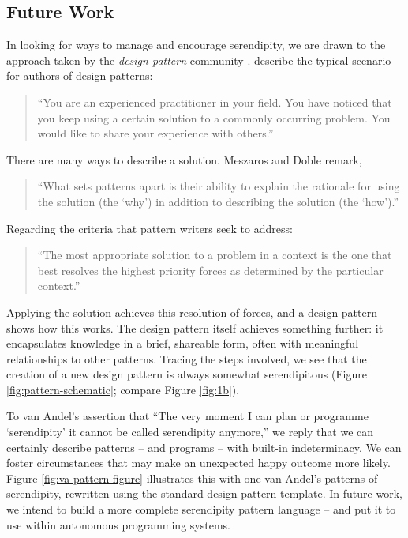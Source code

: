 \subsection{Future Work} \label{sec:futurework} \label{sec:hatching}

In looking for ways to manage and encourage serendipity, we are drawn
to the approach taken by the \emph{design pattern} community
\cite{alexander1999origins}. 
 describe the typical scenario for authors of design patterns:

\begin{quote}
\noindent ``You are an experienced practitioner in your field.  You
have noticed that you keep using a certain solution to a commonly
occurring problem.  You would like to share your experience with
others.''
\end{quote}
There are many ways to describe a solution.
Meszaros and Doble remark,
\begin{quote}
\noindent ``What sets patterns apart is their ability to explain the
rationale for using the solution (the `why') in addition to describing
the solution (the `how').''
\end{quote}
Regarding the criteria that pattern writers seek to address: 
\begin{quote}
\noindent ``The most appropriate solution to a problem in a context is
the one that best resolves the highest priority forces as determined
by the particular context.''
\end{quote}



%
%
Applying the solution achieves this resolution of forces, and a design
pattern shows how this works.  The design pattern itself achieves
something further: it encapsulates knowledge in a brief, shareable
form, often with meaningful relationships to other patterns.  Tracing
the steps involved, we see that the creation of a new design pattern
is always somewhat serendipitous (Figure \ref{fig:pattern-schematic};
compare Figure \ref{fig:1b}).  

To van Andel's assertion that ``The
very moment I can plan or programme `serendipity' it cannot be called
serendipity anymore,'' we reply that we can certainly describe
patterns -- and programs -- with built-in indeterminacy.  We can
foster circumstances that may make an unexpected happy outcome more
likely.  Figure \ref{fig:va-pattern-figure} illustrates this with one
van Andel's patterns of serendipity, rewritten using the standard
design pattern template.  In future work, we intend to build a more
complete serendipity pattern language -- and put it to use within
autonomous programming systems.


